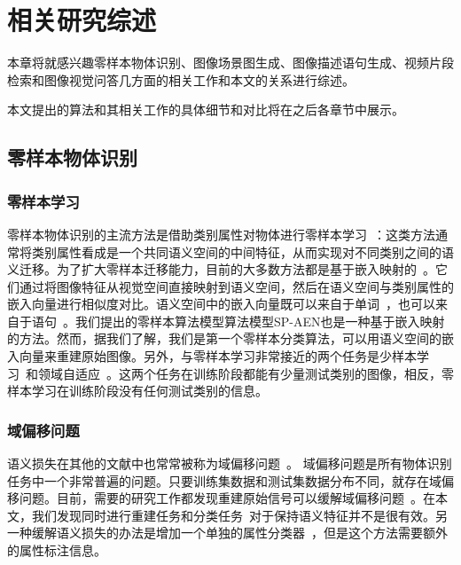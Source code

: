 \chapter{相关研究综述}

本章将就感兴趣零样本物体识别、图像场景图生成、图像描述语句生成、视频片段检索和图像视觉问答几方面的相关工作和本文的关系进行综述。

本文提出的算法和其相关工作的具体细节和对比将在之后各章节中展示。


\section{零样本物体识别}

\subsection{零样本学习}
零样本物体识别的主流方法是借助类别属性对物体进行零样本学习~\cite{farhadi2009describing,lampert2009learning,romera2015embarrassingly,norouzi2014zero,demirel2017attributes2classname,jiang2017learning}：这类方法通常将类别属性看成是一个共同语义空间的中间特征，从而实现对不同类别之间的语义迁移。为了扩大零样本迁移能力，目前的大多数方法都是基于嵌入映射的~\cite{frome2013devise,akata2015label,akata2015evaluation,romera2015embarrassingly,xian2016latent,socher2013zero,kodirov2017semantic,li2017zero}。它们通过将图像特征从视觉空间直接映射到语义空间，然后在语义空间与类别属性的嵌入向量进行相似度对比。语义空间中的嵌入向量既可以来自于单词~\cite{mikolov2013distributed,pennington2014glove}，也可以来自于语句~\cite{lei2015predicting,elhoseiny2013write}。我们提出的零样本算法模型算法模型SP-AEN也是一种基于嵌入映射的方法。然而，据我们了解，我们是第一个零样本分类算法，可以用语义空间的嵌入向量来重建原始图像。另外，与零样本学习非常接近的两个任务是少样本学习~\cite{hariharan2017low}和领域自适应~\cite{motiian2017unified,panareda2017open}。这两个任务在训练阶段都能有少量测试类别的图像，相反，零样本学习在训练阶段没有任何测试类别的信息。


\subsection{域偏移问题}
语义损失在其他的文献中也常常被称为域偏移问题~\cite{fu2015transductive,saenko2010adapting}。
域偏移问题是所有物体识别任务中一个非常普遍的问题。只要训练集数据和测试集数据分布不同，就存在域偏移问题。目前，需要的研究工作都发现重建原始信号可以缓解域偏移问题~\cite{kim2017learning}。在本文，我们发现同时进行重建任务和分类任务~\cite{kodirov2017semantic}对于保持语义特征并不是很有效。另一种缓解语义损失的办法是增加一个单独的属性分类器~\cite{morgado2017semantically}，但是这个方法需要额外的属性标注信息。


